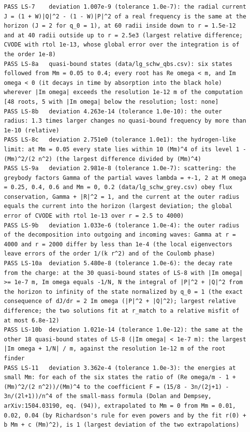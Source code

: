 \documentclass[
  10pt,
]{article}
\begin{document}
\begin{verbatim}
PASS LS-7    deviation 1.007e-9 (tolerance 1.0e-7): the radial current J = (1 + W)|Q|^2 - (1 - W)|P|^2 of a real frequency is the same at the horizon (J = 2 for q_0 = 1), at 60 radii inside down to r = 1.5e-12 and at 40 radii outside up to r = 2.5e3 (largest relative difference; CVODE with rtol 1e-13, whose global error over the integration is of the order 1e-8)
PASS LS-8a   quasi-bound states (data/lg_schw_qbs.csv): six states followed from Mm = 0.05 to 0.4; every root has Re omega < m, and Im omega < 0 (it decays in time by absorption into the black hole) wherever |Im omega| exceeds the resolution 1e-12 m of the computation [48 roots, 5 with |Im omega| below the resolution; lost: none]
PASS LS-8b   deviation 4.263e-14 (tolerance 1.0e-10): the outer radius: 1.3 times larger changes no quasi-bound frequency by more than 1e-10 (relative)
PASS LS-8c   deviation 2.751e0 (tolerance 1.0e1): the hydrogen-like limit: at Mm = 0.05 every state lies within 10 (Mm)^4 of its level 1 - (Mm)^2/(2 n^2) (the largest difference divided by (Mm)^4)
PASS LS-9a   deviation 2.981e-8 (tolerance 1.0e-7): scattering: the greybody factors Gamma of the partial waves lambda = +-1, 2 at M omega = 0.25, 0.4, 0.6 and Mm = 0, 0.2 (data/lg_schw_grey.csv) obey flux conservation, Gamma + |R|^2 = 1, and the current at the outer radius equals the current into the horizon (largest deviation; the global error of CVODE with rtol 1e-13 over r = 2.5 to 4000)
PASS LS-9b   deviation 1.033e-6 (tolerance 1.0e-4): the outer radius of the decomposition into outgoing and incoming waves: Gamma at r = 4000 and r = 2000 differ by less than 1e-4 (the local eigenvectors leave errors of the order 1/(k r^2) and of the Coulomb phase)
PASS LS-10a  deviation 5.480e-8 (tolerance 1.0e-6): the decay rate from the charge: at the 30 quasi-bound states of LS-8 with |Im omega| >= 1e-7 m, Im omega equals -1/N, N the integral of |P|^2 + |Q|^2 from the horizon to infinity of the state normalized by q_0 = 1 (the exact consequence of dJ/dr = 2 Im omega (|P|^2 + |Q|^2); largest relative difference; the two solutions fit at r_match to a relative misfit of at most 6.8e-12)
PASS LS-10b  deviation 1.021e-14 (tolerance 1.0e-12): the same at the other 18 quasi-bound states of LS-8 (|Im omega| < 1e-7 m): the largest |Im omega + 1/N| / m, against the resolution 1e-12 m of the root finder
PASS LS-11   deviation 3.362e-4 (tolerance 1.0e-3): the energies at small Mm: for each of the six states the ratio of (Re omega/m - 1 + (Mm)^2/(2 n^2))/(Mm)^4 to the coefficient F = (15/8 - 3n/(2j+1) - 3n/(2l+1))/n^4 of the small-mass formula (Dolan and Dempsey, arXiv:1504.03190, eq. (94)), extrapolated to Mm = 0 from Mm = 0.01, 0.02, 0.04 (by Richardson's rule for even powers and by the fit r(0) + b Mm + c (Mm)^2), is 1 (largest deviation of the two extrapolations)

\end{verbatim}
\end{document}
